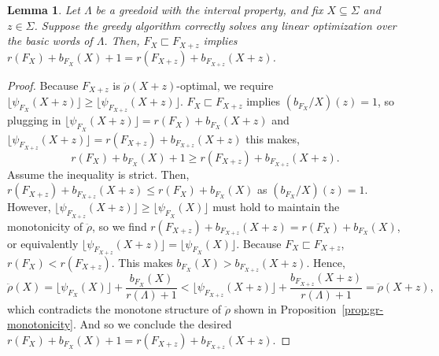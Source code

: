\documentclass[11pt]{article}
\newtheorem{lemma}[theorem]{Lemma}
\newcommand{\univ}{\Sigma}
\newcommand{\glang}{\Lambda}
\newcommand{\greedyrep}{\ddot{\rho}}
\begin{document}
\begin{lemma}
    Let $\glang$ be a greedoid with the interval property, and fix $X\subseteq \univ$ and $z \in \univ$.
    Suppose the greedy algorithm correctly solves any linear optimization over the basic words of $\glang$.
   Then, $F_X\sqsubset F_{X+z}$ implies $r(F_X) + b_{F_X}(X) + 1 = r(F_{X+z}) + b_{F_{X+z}}(X+z)$.
\end{lemma}
\begin{proof}
    Because $F_{X+z}$ is $\greedyrep(X+z)$-optimal, we require $\lfloor\psi_{F_X}(X+z)\rfloor \geq \lfloor \psi_{F_{X+z}}(X+z)\rfloor$.
    $F_X\sqsubset F_{X+z}$ implies $\left(b_{F_X}/X\right)(z) = 1$, so plugging in $\lfloor\psi_{F_X}(X+z)\rfloor = r(F_X) + b_{F_X}(X+z)$ and $\lfloor\psi_{F_{X+z}}(X+z)\rfloor = r(F_{X+z}) + b_{F_{X+z}}(X+z)$ this makes,
    \begin{equation}\label{eq:floor-psi-x-xz}
        r(F_X) + b_{F_X}(X) + 1 \geq r(F_{X+z}) + b_{F_{X+z}}(X+z).
    \end{equation}
    Assume the inequality is strict.
    Then, $r(F_{X+z}) + b_{F_{X+z}}(X+z) \leq r(F_X) + b_{F_X}(X)$ as $\left(b_{F_X}/X\right)(z) = 1$.
    However, $\lfloor\psi_{F_{X+z}}(X+z)\rfloor \geq \lfloor\psi_{F_X}(X)\rfloor$ must hold to maintain the monotonicity of $\greedyrep$, so we find $r(F_{X+z}) + b_{F_{X+z}}(X+z) = r(F_X) + b_{F_X}(X)$, or equivalently $\lfloor \psi_{F_{X+z}}(X+z) \rfloor = \lfloor \psi_{F_X}(X)\rfloor$.
    Because $F_X\sqsubset F_{X+z}$, $r(F_X) < r(F_{X+z})$.
    This makes $b_{F_X}(X) > b_{F_{X+z}}(X+z)$.
    Hence,
    \[
        \greedyrep(X) = \lfloor \psi_{F_X}(X)\rfloor + \frac{b_{F_X}(X)}{r(\glang)+1} < \lfloor \psi_{F_{X+z}}(X+z) \rfloor + \frac{b_{F_{X+z}}(X+z)}{r(\glang)+1} = \greedyrep(X+z),
    \]
    which contradicts the monotone structure of $\greedyrep$ shown in Proposition~\ref{prop:gr-monotonicity}.
    And so we conclude the desired $r(F_X) + b_{F_X}(X) + 1 = r(F_{X+z}) + b_{F_{X+z}}(X+z)$.
\end{proof}
\end{document}
